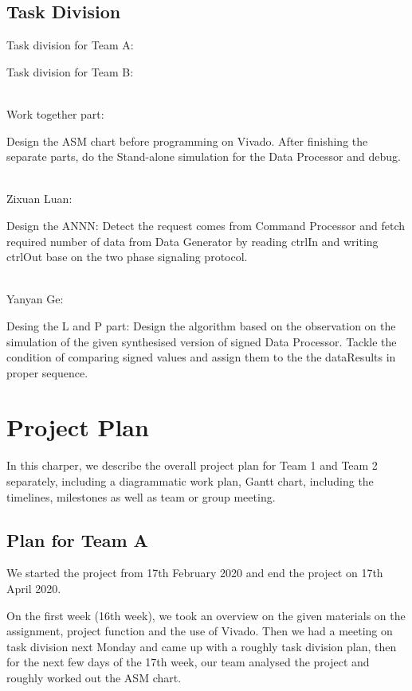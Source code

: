 \documentclass[11pt,a4paper]{report}
\begin{document}
\section{Task Division}
\label{sec:Task Division}


Task division for Team A:




Task division for Team B:

~\\Work together part:

Design the ASM chart before programming on Vivado. 
After finishing the separate parts, do the Stand-alone simulation for the Data Processor and debug.


~\\Zixuan Luan: 

Design the ANNN: Detect the request comes from Command Processor and fetch required number of data from Data Generator by reading ctrlIn and writing ctrlOut base on the two phase signaling protocol. 

~\\Yanyan Ge:

Desing the L and P part: Design the algorithm based on the observation on the simulation of the given synthesised version of signed Data Processor. Tackle the condition of comparing signed values and assign them to the the dataResults in proper sequence.


\chapter{Project Plan}
\label{Project Plan}

In this charper, we describe the overall project plan for Team 1 and Team 2 separately, including a diagrammatic
work plan, Gantt chart, including the timelines, milestones as well as team or group meeting.

\section{Plan for Team A}
\label{sec:Plan for Team A}

We started the project from 17th February 2020 and end the project on 17th April 2020. 

On the first week (16th week), we took an overview on the given materials on the assignment, project function and the use of Vivado. Then we had a meeting on task division next Monday and came up with a roughly task division plan, then for the next few days of the 17th week, our team analysed the project and roughly worked out the ASM chart.
\end{document}
